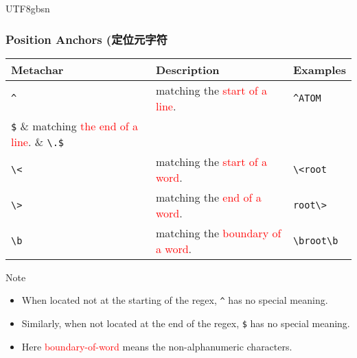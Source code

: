 \documentclass[red]{beamer}
\newcommand*{\lstverb}{\lstinline[style=caret]}
\begin{document}
\begin{CJK*}{UTF8}{gbsn}
\begin{frame}
\frametitle{Position Anchors (定位元字符}
\begin{table}[ht]
\scriptsize
\renewcommand\arraystretch{2.0}
\begin{tabular}{lll}
\hline
\textbf{Metachar} & \textbf{Description} & \textbf{Examples}\\
\hline
\lstverb|^| & matching the \textcolor{red}{start of a line}. & \lstverb|^ATOM|\\
\lstverb|$| & matching \textcolor{red}{the end of a line}. & \lstverb|\.$|\\
\lstverb|\<| & matching the \textcolor{red}{start of a word}. & \lstverb|\<root|\\
\lstverb|\>| & matching the \textcolor{red}{end of a word}. & \lstverb|root\>|\\
\lstverb|\b| & matching the \textcolor{red}{boundary of a word}. & \lstverb|\broot\b|\\
\hline
\end{tabular}
\end{table}
\begin{block}{\centering Note}
\begin{itemize}
\scriptsize
	\item When located not at the starting of the regex, \lstverb|^| has no
			special meaning.
	\item Similarly, when not located at the end of the regex, \lstverb|$| has 
			no special meaning. 
	\item Here \textcolor{red}{boundary-of-word} means the non-alphanumeric characters.
\end{itemize}
\end{block}
\end{frame}



\end{CJK*}
\end{document}
